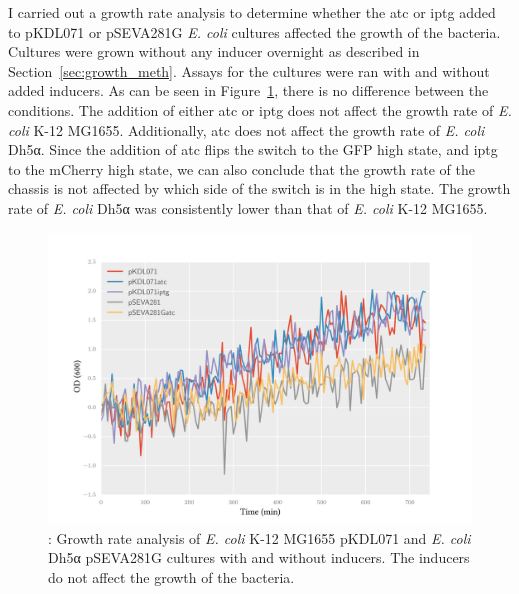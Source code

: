 I carried out a growth rate analysis to determine whether the \acrshort{atc} or \acrshort{iptg} added to pKDL071 or pSEVA281G \textit{E. coli} cultures affected the growth of the bacteria. Cultures were grown without any inducer overnight as described in Section~\ref{sec:growth_meth}. Assays for the cultures were ran with and without added inducers. As can be seen in Figure~\ref{fig:growth_curve}, there is no difference between the conditions. The addition of either \acrshort{atc} or \acrshort{iptg} does not affect the growth rate of \textit{E. coli} K-12 MG1655. Additionally, \acrshort{atc} does not affect the growth rate of \textit{E. coli} Dh5α. Since the addition of \acrshort{atc} flips the switch to the GFP high state, and \acrshort{iptg} to the mCherry high state, we can also conclude that the growth rate of the chassis is not affected by which side of the switch is in the high state. The growth rate of \textit{E. coli} Dh5α was consistently lower than that of \textit{E. coli} K-12 MG1655.

\begin{figure}[htbp]
	\begin{center}
		\includegraphics[scale=0.6]{../../chapters/chapterABCFlow/images/growth_curves.png}
		\caption[Growth rate curves of cultures with and without inducers]{\label{fig:growth_curve}: Growth rate analysis of \textit{E. coli} K-12 MG1655 pKDL071 and \textit{E. coli} Dh5α pSEVA281G cultures with and without inducers. The inducers do not affect the growth of the bacteria. }
	\end{center}
\end{figure}

\clearpage



